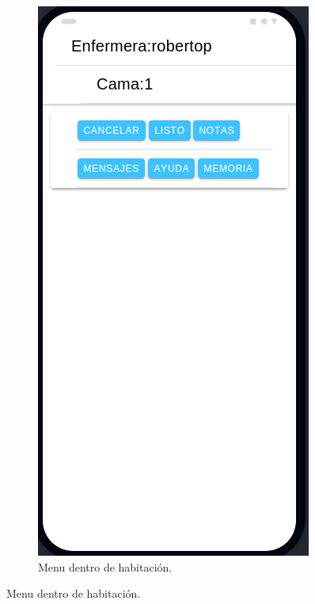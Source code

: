 \begin{figure}[!htpb]
     \centering
     \begin{subfigure}[b]{0.3\textwidth}
         \centering
         \includegraphics[width=.95\textwidth]{./Figures/app/enfermera-trabajando.png}
         \caption{Menu dentro de habitación.}
         \label{fig_3:1de3}

\end{subfigure}
\end{figure}
